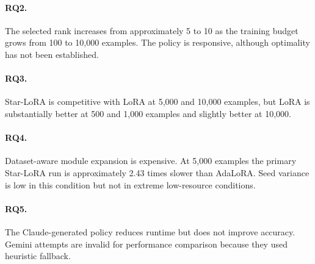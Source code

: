 \paragraph{RQ2.}
The selected rank increases from approximately 5 to 10 as the training budget grows from 100 to
10,000 examples. The policy is responsive, although optimality has not been established.

\paragraph{RQ3.}
Star-LoRA is competitive with LoRA at 5,000 and 10,000 examples, but LoRA is substantially better
at 500 and 1,000 examples and slightly better at 10,000.

\paragraph{RQ4.}
Dataset-aware module expansion is expensive. At 5,000 examples the primary Star-LoRA run is
approximately 2.43 times slower than AdaLoRA. Seed variance is low in this condition but not in
extreme low-resource conditions.

\paragraph{RQ5.}
The Claude-generated policy reduces runtime but does not improve accuracy. Gemini attempts are
invalid for performance comparison because they used heuristic fallback.
